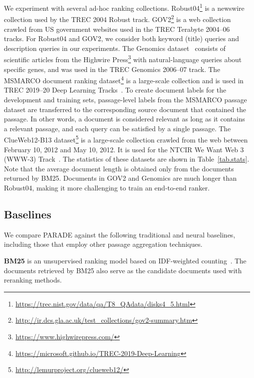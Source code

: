We experiment with several ad-hoc ranking collections.
Robust04\footnote{\url{https://trec.nist.gov/data/qa/T8_QAdata/disks4_5.html}} is a newswire collection used by the TREC 2004 Robust track.
GOV2\footnote{\url{http://ir.dcs.gla.ac.uk/test_collections/gov2-summary.htm}} is a web collection crawled from US government websites used in the TREC Terabyte 2004--06 tracks.
For Robust04 and GOV2, we consider both keyword (title) queries and description queries in our experiments.
The Genomics dataset~\cite{Hersh2006TrecGenomics,Hersh2007TrecGenomics} consists of scientific articles from the Highwire Press\footnote{\url{https://www.highwirepress.com/}} with natural-language queries about specific genes, and was used in the TREC Genomics 2006--07 track.
The MSMARCO document ranking dataset\footnote{\url{https://microsoft.github.io/TREC-2019-Deep-Learning}} is a large-scale collection and is used in TREC 2019--20 Deep Learning Tracks~\cite{DBLP:conf/trec/CraswellMYCV19,DBLP:conf/trec/CraswellMYC20}.
To create document labels for the development and training sets, passage-level labels from the MSMARCO passage dataset are transferred to the corresponding source document that contained the passage.
In other words, a document is considered relevant as long as it contains a relevant passage, and each query can be satisfied by a single passage.
The ClueWeb12-B13 dataset\footnote{\url{http://lemurproject.org/clueweb12/}} is a large-scale collection crawled from the web between February 10, 2012 and May 10, 2012. 
It is used for the NTCIR We Want Web 3 (WWW-3) Track~\cite{WWW-3}.
The statistics of these datasets are shown in Table~\ref{tab.stats}.
Note that the average document length is obtained only from the documents returned by BM25. 
Documents in GOV2 and Genomics are much longer than Robust04, making it more challenging to train an end-to-end ranker.







\subsection{Baselines}
We compare PARADE against the following traditional and neural baselines, including those that employ other passage aggregation techniques.

{\bf BM25} 
is  an  unsupervised  ranking  model  based  on  IDF-weighted counting~\cite{DBLP:conf/trec/RobertsonWHGP95}.
The documents retrieved by BM25 also serve as the candidate documents used with reranking methods.

